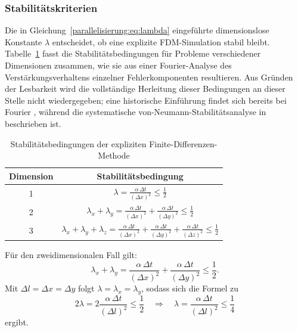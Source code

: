 \subsubsection{Stabilitätskriterien}

Die in Gleichung~\eqref{parallelisierung:eq:lambda} eingeführte dimensionslose Konstante \(\lambda\) entscheidet, 
ob eine explizite FDM-Simulation stabil bleibt.  
Tabelle~\ref{parallelisierung:tab:stabilitaet_fdm} fasst die Stabilitätsbedingungen für Probleme verschiedener 
Dimensionen zusammen, wie sie aus einer Fourier-Analyse des Verstärkungsverhaltens einzelner Fehlerkomponenten 
resultieren.  
Aus Gründen der Lesbarkeit wird die vollständige Herleitung dieser Bedingungen an dieser Stelle nicht wiedergegeben; 
eine historische Einführung findet sich bereits bei Fourier \cite{Fourier1822}, während die systematische 
von-Neumann-Stabilitätsanalyse in \cite{VonNeumann1950} beschrieben ist.

\label{parallelisierung:sec:stabilitaetskriterien}

\begin{table}
	\centering
	\caption{Stabilitätsbedingungen der expliziten Finite-Differenzen-Methode}
	\label{parallelisierung:tab:stabilitaet_fdm}
	\begin{tabular}{|c|c|}
		\hline
		\textbf{Dimension} & \textbf{Stabilitätsbedingung} \\
		\hline
		1 & 
		\( \displaystyle \lambda = \frac{\alpha \, \Delta t}{(\Delta x)^2} \leq \frac{1}{2} \) \\
		\hline
		2 & 
		\( \displaystyle \lambda_x + \lambda_y =
		\frac{\alpha \, \Delta t}{(\Delta x)^2} +
		\frac{\alpha \, \Delta t}{(\Delta y)^2} \leq \frac{1}{2} \) \\
		\hline
		3 & 
		\( \displaystyle \lambda_x + \lambda_y + \lambda_z =
		\frac{\alpha \, \Delta t}{(\Delta x)^2} +
		\frac{\alpha \, \Delta t}{(\Delta y)^2} +
		\frac{\alpha \, \Delta t}{(\Delta z)^2} \leq \frac{1}{2} \) \\
		\hline
	\end{tabular}
\end{table}



Für den zweidimensionalen Fall gilt:
\begin{equation}
	\lambda_x + \lambda_y =
	\frac{\alpha \, \Delta t}{(\Delta x)^2} +
	\frac{\alpha \, \Delta t}{(\Delta y)^2} \leq \frac{1}{2}.
\end{equation}
Mit \(\Delta l = \Delta x = \Delta y\) folgt \(\lambda = \lambda_x = \lambda_y\), sodass sich die Formel zu
\begin{equation}
	\label{parallelisierung:eq:stabForExp}
	2\lambda = 2 \frac{\alpha \, \Delta t}{(\Delta l)^2} \leq \frac{1}{2}
	\quad \Rightarrow \quad
	\lambda = \frac{\alpha \, \Delta t}{(\Delta l)^2} \leq \frac{1}{4}
\end{equation}
ergibt.

